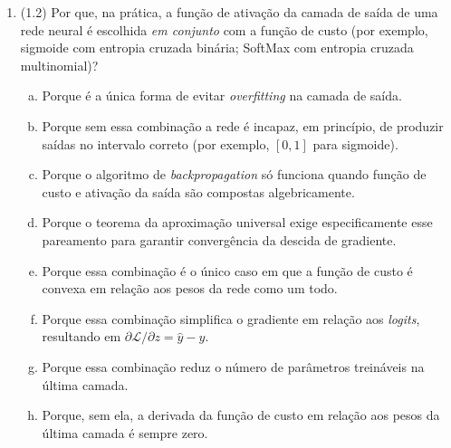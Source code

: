 \documentclass[11pt,a4paper]{article}
\begin{document}
\begin{enumerate}[1)]
\item (1.2) Por que, na prática, a função de ativação da camada de saída de uma rede neural é escolhida \emph{em conjunto} com a função de custo (por exemplo, sigmoide com entropia cruzada binária; SoftMax com entropia cruzada multinomial)?
\begin{enumerate}[a)]
    \item Porque é a única forma de evitar \textit{overfitting} na camada de saída.
    \item Porque sem essa combinação a rede é incapaz, em princípio, de produzir saídas no intervalo correto (por exemplo, $[0, 1]$ para sigmoide).
    \item Porque o algoritmo de \textit{backpropagation} só funciona quando função de custo e ativação da saída são compostas algebricamente.
    \item Porque o teorema da aproximação universal exige especificamente esse pareamento para garantir convergência da descida de gradiente.
    \item Porque essa combinação é o único caso em que a função de custo é convexa em relação aos pesos da rede como um todo.
    \item Porque essa combinação simplifica o gradiente em relação aos \textit{logits}, resultando em $\partial \mathcal{L} / \partial z = \hat{y} - y$.
    \item Porque essa combinação reduz o número de parâmetros treináveis na última camada.
    \item Porque, sem ela, a derivada da função de custo em relação aos pesos da última camada é sempre zero.
\end{enumerate}


\end{enumerate}
\end{document}
